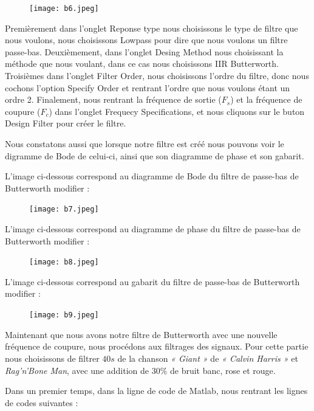 \documentclass[conference,onecolumn]{IEEEtran}
\begin{document}
 \begin{figure}[H]
 \centering
    \texttt{[image: b6.jpeg]}
\end{figure}


Premièrement dans l'onglet Reponse type nous choisissons le type de filtre que nous voulons, nous choisissons Lowpass pour dire que nous voulons un filtre passe-bas. Deuxièmement, dans l'onglet Desing Method nous choisissant la méthode que nous voulant, dans ce cas nous choisissons IIR Butterworth. Troisièmes dans l'onglet Filter Order, nous choisissons l'ordre du filtre, donc nous cochons l'option Specify Order et rentrant l'ordre que nous voulons étant un ordre 2. Finalement, nous rentrant la fréquence de sortie ($F_s$) et la fréquence de coupure ($F_c$) dans l'onglet Frequecy Specifications, et nous cliquons sur le buton Design Filter pour créer le filtre. 

Nous constatons aussi que lorsque notre filtre est créé nous pouvons voir le digramme de Bode de celui-ci, ainsi que son diagramme de phase et son gabarit. 

L'image ci-dessous correspond au diagramme de Bode du filtre de passe-bas de Butterworth modifier :

 \begin{figure}[H]
 \centering
    \texttt{[image: b7.jpeg]}
\end{figure}


L'image ci-dessous correspond au diagramme de phase du filtre de passe-bas de Butterworth modifier :

 \begin{figure}[H]
 \centering
    \texttt{[image: b8.jpeg]}
\end{figure}


L'image ci-dessous correspond au gabarit du filtre de passe-bas de Butterworth modifier :


 \begin{figure}[H]
 \centering
    \texttt{[image: b9.jpeg]}
\end{figure}


Maintenant que nous avons notre filtre de Butterworth avec une nouvelle fréquence de coupure, nous procédons aux filtrages des signaux. Pour cette partie nous choisissons de filtrer $40s$ de la chanson \textit{« Giant »} de \textit{« Calvin Harris »} et \textit{Rag'n'Bone Man}, avec une addition de 30\% de bruit banc, rose et rouge.

Dans un premier temps, dans la ligne de code de Matlab, nous rentrant les lignes de codes suivantes :
\end{document}
